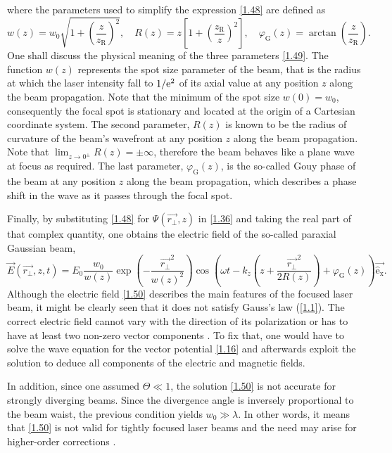where the parameters used to simplify the expression \ref{1.48} are defined as
\begin{equation}
\label{1.49}
w\left(z\right) = w_0 \sqrt{1 + \left(\frac{z}{z_\mathrm{R}}\right)^2}, \quad R\left(z \right) = z \left[1 + \left(\frac{z_\mathrm{R}}{z} \right)^2\right], \quad \varphi_\mathrm{G}\left(z\right) = \arctan{\left(\frac{z}{z_\mathrm{R}}\right)}.
\end{equation}
One shall discuss the physical meaning of the three parameters \ref{1.49}. The function $ w\left(z\right) $ represents the spot size parameter of the beam, that is the radius at which the laser intensity fall to $ 1/\mathrm{e}^2 $ of its axial value at any position $ z $ along the beam propagation. Note that the minimum of the spot size $ w(0) = w_0 $, consequently the focal spot is stationary and located at the origin of a Cartesian coordinate system. The second parameter, $ R\left(z \right) $ is known to be the radius of curvature of the beam's wavefront at any position $ z $ along the beam propagation. Note that $ \lim_{z \to 0^{\pm}} R(z) = \pm \infty $, therefore the beam behaves like a plane wave at focus as required. The last parameter, $ \varphi_\mathrm{G}\left(z\right) $, is the so-called Gouy phase \cite{Pang2012} of the beam at any position $ z $ along the beam propagation, which describes a phase shift in the wave as it passes through the focal spot.

Finally, by substituting \ref{1.48} for $ \Psi \left(\vec{r_\bot}, z \right) $ in \ref{1.36} and taking the real part of that complex quantity, one obtains the electric field of the so-called paraxial Gaussian beam,
\begin{equation}
\label{1.50}
\vec{E}\left(\vec{r_\bot}, z, t \right) = E_0 \frac{w_0}{w(z)} \exp\left(-\frac{\vec{r_\bot}^2}{w(z)^2}\right) \cos\left(\omega t - k_z \left(z + \frac{\vec{r_\bot}^2}{2 R(z)} \right) + \varphi_\mathrm{G}\left(z\right) \right) \mathrm{\vec{\hat{e}_x}}.
\end{equation}
Although the electric field \ref{1.50} describes the main features of the focused laser beam, it might be clearly seen that it does not satisfy Gauss's law (\ref{1.1}). The correct electric field cannot vary with the direction of its polarization or has to have at least two non-zero vector components \cite{Davis1979}. To fix that, one would have to solve the wave equation for the vector potential \ref{1.16} and afterwards exploit the solution to deduce all components of the electric and magnetic fields.   

In addition, since one assumed $ \Theta \ll 1 $, the solution \ref{1.50} is not accurate for strongly diverging beams. Since the divergence angle is inversely proportional to the beam waist, the previous condition yields $ w_0 \gg \lambda $. In other words, it means that \ref{1.50} is not valid for tightly focused laser beams and the need may arise for higher-order corrections \cite{Thiele2016}. 